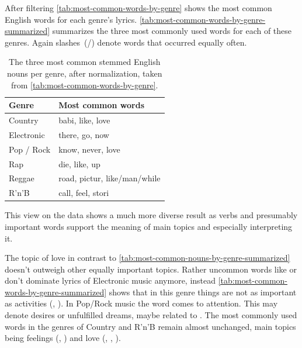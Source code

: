 \documentclass[                                                             %
        12pt,                                                                   %
        twoside                                                                 %
    ]{scrartcl}                                                                 %
\begin{document}
After filtering \autoref{tab:most-common-words-by-genre} shows the 
most common English words for each genre's lyrics.
\autoref{tab:most-common-words-by-genre-summarized} summarizes
the three most commonly used words for each of these genres.
Again slashes~(/) denote words that occurred equally often.

\begin{table}
    \caption[The three most common stemmed English words per genre.]{%
        The three most common stemmed English nouns per genre, 
        after normalization,
        taken from \autoref{tab:most-common-words-by-genre}.
    }
    \label{tab:most-common-words-by-genre-summarized}
    \centering
    \begin{tabu} spread 0.9\linewidth {l l}
    	\toprule
    	Genre      & Most common words            \\ \midrule
    	Country    & babi, like, love             \\
    	Electronic & there, go, now               \\
    	Pop / Rock & know, never, love            \\
    	Rap        & die, like, up                \\
    	Reggae     & road, pictur, like/man/while \\
    	R'n'B      & call, feel, stori            \\ \bottomrule
    \end{tabu}
\end{table}

This view on the data shows a much more diverse result as verbs 
and presumably important words support the meaning of main topics
and especially interpreting it.

The topic of love in contrast to \autoref{tab:most-common-nouns-by-genre-summarized}
doesn't outweigh other equally important topics. 
Rather uncommon words like  or  
don't dominate lyrics of Electronic music anymore, 
instead \autoref{tab:most-common-words-by-genre-summarized} shows 
that in this genre things are not as important 
as activities (, ).
In Pop/Rock music the word  comes to attention.
This may denote desires or unfulfilled dreams,
maybe related to .
The most commonly used words in the genres of Country and R'n'B 
remain almost unchanged, main topics being 
feelings (, ) 
and love (, , ).
\end{document}
